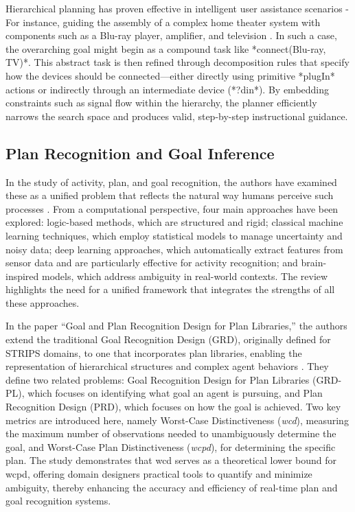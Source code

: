 \documentclass[a4paper,11pt]{lmcs}
\begin{document}
Hierarchical planning has proven effective in intelligent user assistance scenarios -For instance, guiding the assembly of a complex home theater system with components such as a Blu-ray player, amplifier, and television \cite{hplan1}. In such a case, the overarching goal might begin as a compound task like *connect(Blu-ray, TV)*. This abstract task is then refined through decomposition rules that specify how the devices should be connected—either directly using primitive *plugIn* actions or indirectly through an intermediate device (*?din*). By embedding constraints such as signal flow within the hierarchy, the planner efficiently narrows the search space and produces valid, step-by-step instructional guidance.
\subsection*{Plan Recognition and Goal Inference}
In the study of activity, plan, and goal recognition, the authors have examined these as a unified problem that reflects the natural way humans perceive such processes \citep{goal_act_plan}. From a computational perspective, four main approaches have been explored: logic-based methods, which are structured and rigid; classical machine learning techniques, which employ statistical models to manage uncertainty and noisy data; deep learning approaches, which automatically extract features from sensor data and are particularly effective for activity recognition; and brain-inspired models, which address ambiguity in real-world contexts. The review highlights the need for a unified framework that integrates the strengths of all these approaches.

In the paper “Goal and Plan Recognition Design for Plan Libraries,” the authors extend the traditional Goal Recognition Design (GRD), originally defined for STRIPS domains, to one that incorporates plan libraries, enabling the representation of hierarchical structures and complex agent behaviors \citep{plan_library}. They define two related problems: Goal Recognition Design for Plan Libraries (GRD-PL), which focuses on identifying what goal an agent is pursuing, and Plan Recognition Design (PRD), which focuses on how the goal is achieved. Two key metrics are introduced here, namely Worst-Case Distinctiveness (\textit{wcd}), measuring the maximum number of observations needed to unambiguously determine the goal, and Worst-Case Plan Distinctiveness (\textit{wcpd}), for determining the specific plan. The study demonstrates that wcd serves as a theoretical lower bound for wcpd, offering domain designers practical tools to quantify and minimize ambiguity, thereby enhancing the accuracy and efficiency of real-time plan and goal recognition systems.
\end{document}
